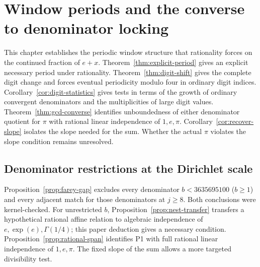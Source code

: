 \documentclass[11pt]{amsart}
\theoremstyle{definition}
\theoremstyle{remark}
\numberwithin{equation}{section}
\begin{document}
\section{Window periods and the converse to denominator locking}\label{sec:windows}

This chapter establishes the periodic window structure that
rationality forces on the continued fraction of $e+x$.
Theorem~\ref{thm:explicit-period} gives an explicit necessary
period under rationality. Theorem~\ref{thm:digit-shift} gives the
complete digit change and forces eventual periodicity modulo four
in ordinary digit indices. Corollary~\ref{cor:digit-statistics}
gives tests in terms of the growth of ordinary convergent
denominators and the multiplicities of large digit values.
Theorem~\ref{thm:gcd-converse} identifies unboundedness of either
denominator quotient for $\pi$ with rational linear independence
of $1,e,\pi$. Corollary~\ref{cor:recover-slope} isolates the slope
needed for the sum. Whether the actual $\pi$ violates the slope
condition remains unresolved.
\subsection{Denominator restrictions at the Dirichlet scale}\label{sec:current-results}
Proposition~\ref{prop:farey-gap} excludes every denominator
$b<3635695100$ ($b\ge1$) and every adjacent match for those denominators
at $j\ge8$. Both conclusions were kernel-checked. For unrestricted $b$,
Proposition~\ref{prop:nest-transfer} transfers a hypothetical rational
affine relation to algebraic independence of $e,\exp(e),\Gamma(1/4)$;
this paper deduction gives a necessary condition. Proposition~\ref{prop:rational-span}
identifies P1 with full rational linear independence of $1,e,\pi$.
The fixed slope of the sum allows a more targeted divisibility test.
\end{document}

